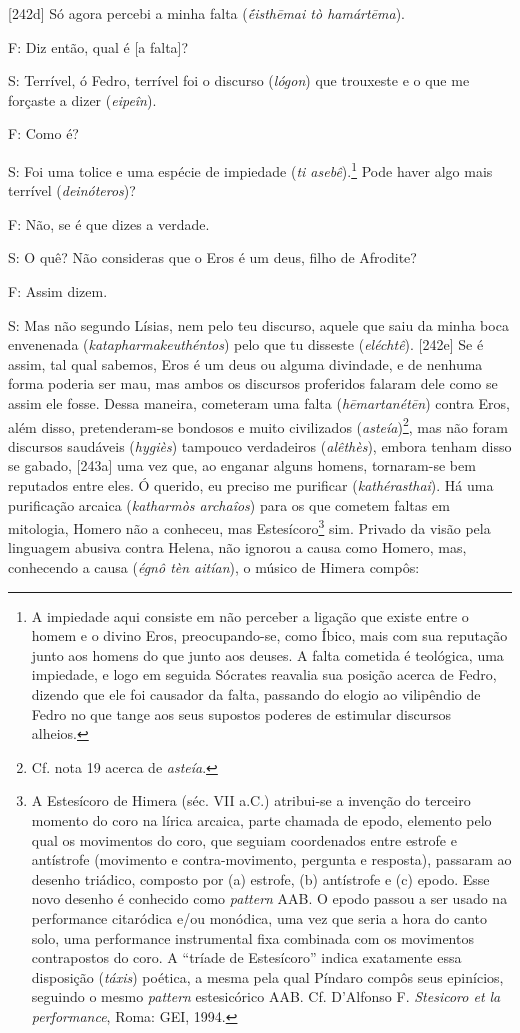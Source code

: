 {[}242d{]} Só agora percebi a minha falta (\emph{ḗisthēmai tò
hamártēma}).

F: Diz então, qual é {[}a falta{]}?

S: Terrível, ó Fedro, terrível foi o discurso (\emph{lógon}) que
trouxeste e o que me forçaste a dizer (\emph{eipeîn}).

F: Como é?

S: Foi uma tolice e uma espécie de impiedade (\emph{ti
asebê}).\footnote{A impiedade aqui consiste em não perceber a ligação
  que existe entre o homem e o divino Eros, preocupando-se, como Íbico,
  mais com sua reputação junto aos homens do que junto aos deuses. A
  falta cometida é teológica, uma impiedade, e logo em seguida Sócrates
  reavalia sua posição acerca de Fedro, dizendo que ele foi causador da
  falta, passando do elogio ao vilipêndio de Fedro no que tange aos seus
  supostos poderes de estimular discursos alheios.} Pode haver algo mais
terrível (\emph{deinóteros})?

F: Não, se é que dizes a verdade.

S: O quê? Não consideras que o Eros é um deus, filho de Afrodite?

F: Assim dizem.

S: Mas não segundo Lísias, nem pelo teu discurso, aquele que saiu da
minha boca envenenada (\emph{katapharmakeuthéntos}) pelo que tu disseste
(\emph{eléchtê}). {[}242e{]} Se é assim, tal qual sabemos, Eros é um
deus ou alguma divindade, e de nenhuma forma poderia ser mau, mas ambos
os discursos proferidos falaram dele como se assim ele fosse. Dessa
maneira, cometeram uma falta (\emph{hēmartanétēn}) contra Eros, além
disso, pretenderam-se bondosos e muito civilizados
(\emph{asteía})\footnote{Cf. nota 19 acerca de \emph{asteía}.}, mas não
foram discursos saudáveis (\emph{hygiès}) tampouco verdadeiros
(\emph{alêthès}), embora tenham disso se gabado, {[}243a{]} uma vez que,
ao enganar alguns homens, tornaram-se bem reputados entre eles. Ó
querido, eu preciso me purificar (\emph{kathérasthai}). Há uma
purificação arcaica (\emph{katharmòs archaîos}) para os que cometem
faltas em mitologia, Homero não a conheceu, mas Estesícoro\footnote{A
  Estesícoro de Himera (séc. VII a.C.) atribui-se a invenção do terceiro
  momento do coro na lírica arcaica, parte chamada de epodo, elemento
  pelo qual os movimentos do coro, que seguiam coordenados entre estrofe
  e antístrofe (movimento e contra-movimento, pergunta e resposta),
  passaram ao desenho triádico, composto por (a) estrofe, (b) antístrofe
  e (c) epodo. Esse novo desenho é conhecido como \emph{pattern} AAB. O
  epodo passou a ser usado na performance citaródica e/ou monódica, uma
  vez que seria a hora do canto solo, uma performance instrumental fixa
  combinada com os movimentos contrapostos do coro. A ``tríade de
  Estesícoro'' indica exatamente essa disposição (\emph{táxis}) poética,
  a mesma pela qual Píndaro compôs seus epinícios, seguindo o mesmo
  \emph{pattern} estesicórico AAB. Cf. D'Alfonso F. \emph{Stesicoro et
  la performance}, Roma: GEI, 1994.} sim. Privado da visão pela
linguagem abusiva contra Helena, não ignorou a causa como Homero, mas,
conhecendo a causa (\emph{égnô tèn aitían}), o músico de Himera compôs:

